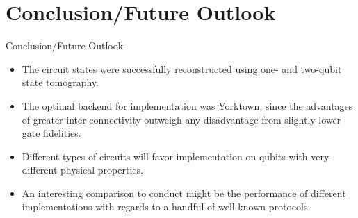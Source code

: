 \section{Conclusion/Future Outlook}
\begin{frame}{Conclusion/Future Outlook}
\begin{itemize}
	\item The circuit states were successfully reconstructed using one- and
two-qubit state tomography.
	\item The optimal backend for implementation was Yorktown, since the
advantages of greater inter-connectivity outweigh any disadvantage from slightly
lower gate fidelities.
	\item Different types of circuits will favor implementation on qubits with
very different physical properties.
	\item An interesting comparison to conduct might be the performance of
different implementations with regards to a handful of well-known protocols.
\end{itemize}
\end{frame}

